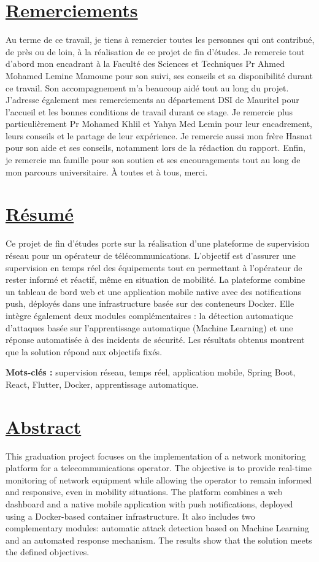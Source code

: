 \documentclass[12pt,a4paper]{report}
\newcommand{\ub}[1]{\uline{\textbf{#1}}}
\begin{document}
\section*{\ub{Remerciements}}
Au terme de ce travail, je tiens à remercier toutes les personnes qui ont contribué, de près ou de loin, à la réalisation de ce projet de fin d'études. Je remercie tout d'abord mon encadrant à la Faculté des Sciences et Techniques Pr Ahmed Mohamed Lemine Mamoune pour son suivi, ses conseils et sa disponibilité durant ce travail. Son accompagnement m'a beaucoup aidé tout au long du projet. J'adresse également mes remerciements au département DSI de Mauritel pour l'accueil et les bonnes conditions de travail durant ce stage. Je remercie plus particulièrement Pr Mohamed Khlil et Yahya Med Lemin pour leur encadrement, leurs conseils et le partage de leur expérience. Je remercie aussi mon frère Hasnat pour son aide et ses conseils, notamment lors de la rédaction du rapport. Enfin, je remercie ma famille pour son soutien et ses encouragements tout au long de mon parcours universitaire. À toutes et à tous, merci.\par

\clearpage
\section*{\ub{Résumé}}
Ce projet de fin d'études porte sur la réalisation d'une plateforme de supervision réseau pour un opérateur de télécommunications. L'objectif est d'assurer une supervision en temps réel des équipements tout en permettant à l'opérateur de rester informé et réactif, même en situation de mobilité. La plateforme combine un tableau de bord web et une application mobile native avec des notifications push, déployés dans une infrastructure basée sur des conteneurs Docker. Elle intègre également deux modules complémentaires : la détection automatique d'attaques basée sur l'apprentissage automatique (Machine Learning) et une réponse automatisée à des incidents de sécurité. Les résultats obtenus montrent que la solution répond aux objectifs fixés.

\textbf{Mots-clés :} supervision réseau, temps réel, application mobile, Spring Boot, React, Flutter, Docker, apprentissage automatique.

\vspace{0.55cm}
\section*{\ub{Abstract}}
This graduation project focuses on the implementation of a network monitoring platform for a telecommunications operator. The objective is to provide real-time monitoring of network equipment while allowing the operator to remain informed and responsive, even in mobility situations. The platform combines a web dashboard and a native mobile application with push notifications, deployed using a Docker-based container infrastructure. It also includes two complementary modules: automatic attack detection based on Machine Learning and an automated response mechanism. The results show that the solution meets the defined objectives.
\end{document}
